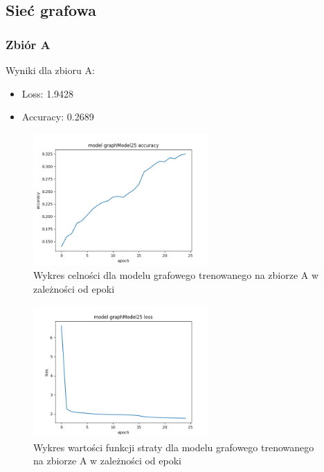 \documentclass{article}
\begin{document}
\subsection{Sieć grafowa}

\subsubsection{Zbiór A}

Wyniki dla zbioru A:
\begin{itemize}
    \item Loss: 1.9428
    \item Accuracy: 0.2689
\end{itemize}

\begin{figure}[H]
    \centering
    \includegraphics[width=0.6\textwidth]{../Saves/Graph/graphModel25_acc.png}
    \caption{Wykres celności dla modelu grafowego trenowanego na zbiorze A w zależności od epoki} 
\end{figure}

\begin{figure}[H]
    \centering
    \includegraphics[width=0.6\textwidth]{../Saves/Graph/graphModel25_loss.png}
    \caption{Wykres wartości funkcji straty dla modelu grafowego trenowanego na zbiorze A w zależności od epoki} 
\end{figure}
\end{document}
